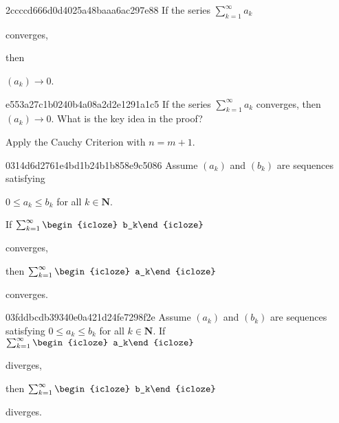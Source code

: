 \begin{note}{2ccccd666d0d4025a48baaa6ac297e88}
    If the series \({ \sum_{k=1}^{\infty} a_k }\) \begin{icloze}{2}converges,\end{icloze} then \begin{icloze}{1}\({ (a_k) \to 0 }\).\end{icloze}
\end{note}

\begin{note}{e553a27c1b0240b4a08a2d2e1291a1c5}
    If the series \({ \sum_{k=1}^{\infty} a_k }\) converges, then \({ (a_k) \to 0 }\).
    What is the key idea in the proof?

    \begin{cloze}{1}
        Apply the Cauchy Criterion with \({ n = m + 1 }\).
    \end{cloze}
\end{note}

\begin{note}{0314d6d2761e4bd1b24b1b858e9c5086}
    Assume \({ (a_k) }\) and \({ (b_k) }\) are sequences satisfying \begin{icloze}{3}\({ 0 \leq a_k \leq b_k }\) for all \({ k \in \mathbf{N} }\).\end{icloze}
    If \({ \sum_{k=1}^{\infty} \begin{icloze}{1}b_k\end{icloze} }\) \begin{icloze}{2}converges,\end{icloze} then \({ \sum_{k=1}^{\infty} \begin{icloze}{1}a_k\end{icloze} }\) \begin{icloze}{2}converges.\end{icloze}
\end{note}

\begin{note}{03fddbcdb39340e0a421d24fe7298f2e}
    Assume \({ (a_k) }\) and \({ (b_k) }\) are sequences satisfying \({ 0 \leq a_k \leq b_k }\) for all \({ k \in \mathbf{N} }\).
    If \({ \sum_{k=1}^{\infty} \begin{icloze}{1}a_k\end{icloze} }\) \begin{icloze}{2}diverges,\end{icloze} then \({ \sum_{k=1}^{\infty} \begin{icloze}{1}b_k\end{icloze} }\) \begin{icloze}{2}diverges.\end{icloze}
\end{note}

